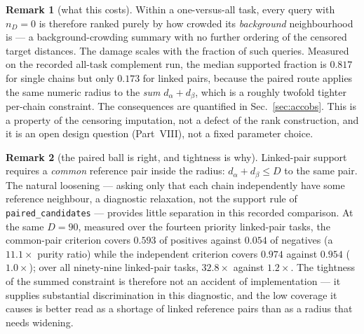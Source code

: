 \documentclass[10pt,a4paper]{article}
\theoremstyle{definition}
\newtheorem{remark}{Remark}
\newcommand{\code}[1]{\texttt{\small #1}}
\begin{document}
\begin{remark}[what this costs]\label{rem:degencost}
Within a one-versus-all task, every query with $n_D=0$ is therefore ranked purely by how crowded its
\emph{background} neighbourhood is --- a background-crowding summary with no further ordering of the censored target distances. The damage scales with the fraction of such queries. Measured on the
recorded all-task complement run, the median supported fraction is $0.817$ for single chains but
only $0.173$ for linked pairs, because the paired route applies the same numeric radius to the
\emph{sum} $d_\alpha+d_\beta$, which is a roughly twofold tighter per-chain constraint. The
consequences are quantified in Sec.~\ref{sec:accobs}. This is a property of the censoring
imputation, not a defect of the rank construction, and it is an open design question
(Part~VIII), not a fixed parameter choice.
\end{remark}

\begin{remark}[the paired ball is right, and tightness is why]\label{rem:ball}
Linked-pair support requires a \emph{common} reference pair inside the radius: $d_\alpha+d_\beta\le
D$ to the same pair. The natural loosening --- asking only that each chain independently have some
reference neighbour, a diagnostic relaxation, not the support rule of \code{paired\_candidates} ---
provides little separation in this recorded comparison. At the same $D=90$, measured over the fourteen priority linked-pair tasks, the
common-pair criterion covers $0.593$ of positives against $0.054$ of negatives (a $11.1\times$
purity ratio) while the independent criterion covers $0.974$ against $0.954$ ($1.0\times$); over all
ninety-nine linked-pair tasks, $32.8\times$ against $1.2\times$. The tightness of the summed
constraint is therefore not an accident of implementation --- it supplies substantial discrimination in this diagnostic, and the low coverage it causes is better read as a shortage of linked
reference pairs than as a radius that needs widening.
\end{remark}
\end{document}
